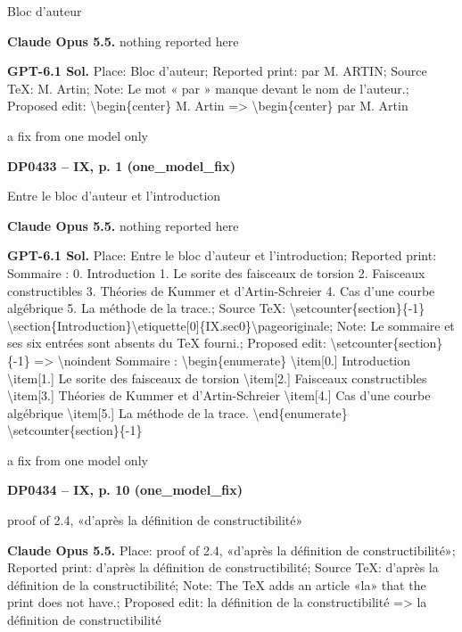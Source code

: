 Bloc d'auteur\par
\textbf{Claude Opus 5.5.} nothing reported here\par
\textbf{GPT-6.1 Sol.} Place: Bloc d'auteur; Reported print: par M. ARTIN; Source TeX: M. Artin; Note: Le mot « par » manque devant le nom de l'auteur.; Proposed edit: \textbackslash{}begin\{center\} M. Artin =\allowbreak > \textbackslash{}begin\{center\} par M. Artin\par
a fix from one model only\par
\par\noindent\hypertarget{DP0433}{}\textbf{DP0433 -- IX, p. 1 (one\_model\_fix)}\par
Entre le bloc d'auteur et l'introduction\par
\textbf{Claude Opus 5.5.} nothing reported here\par
\textbf{GPT-6.1 Sol.} Place: Entre le bloc d'auteur et l'introduction; Reported print: Sommaire : 0. Introduction 1. Le sorite des faisceaux de torsion 2. Faisceaux constructibles 3. Théories de Kummer et d'Artin-Schreier 4. Cas d'une courbe algébrique 5. La méthode de la trace.; Source TeX: \textbackslash{}setcounter\{section\}\{-1\} \textbackslash{}section\{Introduction\}\textbackslash{}etiquette[0]\{IX.sec0\}\textbackslash{}pageoriginale; Note: Le sommaire et ses six entrées sont absents du TeX fourni.; Proposed edit: \textbackslash{}setcounter\{section\}\{-1\} =\allowbreak > \textbackslash{}noindent Sommaire : \textbackslash{}begin\{enumerate\} \textbackslash{}item[0.] Introduction \textbackslash{}item[1.] Le sorite des faisceaux de torsion \textbackslash{}item[2.] Faisceaux constructibles \textbackslash{}item[3.] Théories de Kummer et d'Artin-Schreier \textbackslash{}item[4.] Cas d'une courbe algébrique \textbackslash{}item[5.] La méthode de la trace. \textbackslash{}end\{enumerate\}  \textbackslash{}setcounter\{section\}\{-1\}\par
a fix from one model only\par
\par\noindent\hypertarget{DP0434}{}\textbf{DP0434 -- IX, p. 10 (one\_model\_fix)}\par
proof of 2.4, «d'après la définition de constructibilité»\par
\textbf{Claude Opus 5.5.} Place: proof of 2.4, «d'après la définition de constructibilité»; Reported print: d'après la définition de constructibilité; Source TeX: d'après la définition de la constructibilité; Note: The TeX adds an article «la» that the print does not have.; Proposed edit: la définition de la constructibilité =\allowbreak > la définition de constructibilité\par
